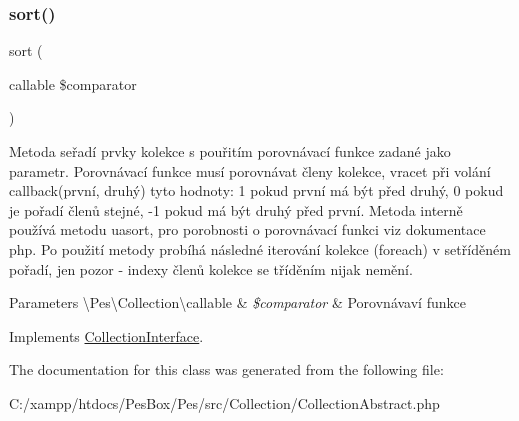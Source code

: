 \subsubsection{\texorpdfstring{sort()}{sort()}}
{\footnotesize\ttfamily sort (\begin{DoxyParamCaption}\item[{callable}]{\$comparator }\end{DoxyParamCaption})}

Metoda seřadí prvky kolekce s pouřitím porovnávací funkce zadané jako parametr. Porovnávací funkce musí porovnávat členy kolekce, vracet při volání callback(první, druhý) tyto hodnoty\+: 1 pokud \textquotesingle{}první\textquotesingle{} má být před \textquotesingle{}druhý\textquotesingle{}, 0 pokud je pořadí členů stejné, -\/1 pokud má být \textquotesingle{}druhý\textquotesingle{} před \textquotesingle{}první\textquotesingle{}. Metoda interně používá metodu uasort, pro porobnosti o porovnávací funkci viz dokumentace php. Po použití metody probíhá následné iterování kolekce (foreach) v setříděném pořadí, jen pozor -\/ indexy členů kolekce se tříděním nijak nemění.


\begin{DoxyParams}[1]{Parameters}
\textbackslash{}\+Pes\textbackslash{}\+Collection\textbackslash{}callable & {\em \$comparator} & Porovnávaví funkce \\
\hline
\end{DoxyParams}


Implements \mbox{\hyperlink{interface_pes_1_1_collection_1_1_collection_interface}{Collection\+Interface}}.



The documentation for this class was generated from the following file\+:\begin{DoxyCompactItemize}
\item 
C\+:/xampp/htdocs/\+Pes\+Box/\+Pes/src/\+Collection/Collection\+Abstract.\+php\end{DoxyCompactItemize}
